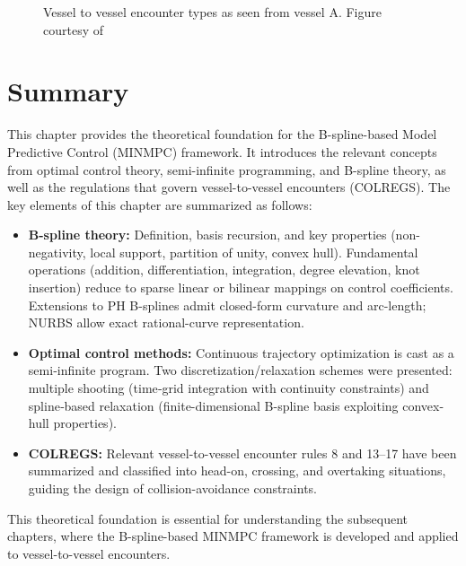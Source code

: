 \begin{figure}[htbp]
    \centering
    
    \caption{Vessel to vessel encounter types as seen from vessel A. Figure courtesy of \cite{Thyri2022-VO}}
    \label{fig:v2v-encounters}
\end{figure}



%     




\section{Summary}
This chapter provides the theoretical foundation for the B-spline-based Model Predictive Control (MINMPC) framework. It introduces the relevant concepts from optimal control theory, semi-infinite programming, and B-spline theory, as well as the regulations that govern vessel-to-vessel encounters (COLREGS).
The key elements of this chapter are summarized as follows:
\begin{itemize}
    \item \textbf{B-spline theory:}  
      Definition, basis recursion, and key properties (non-negativity, local support, partition of unity, convex hull). Fundamental operations (addition, differentiation, integration, degree elevation, knot insertion) reduce to sparse linear or bilinear mappings on control coefficients. Extensions to PH B-splines admit closed-form curvature and arc-length; NURBS allow exact rational-curve representation.
    \item \textbf{Optimal control methods:}  
      Continuous trajectory optimization is cast as a semi‐infinite program. Two discretization/relaxation schemes were presented: multiple shooting (time‐grid integration with continuity constraints) and spline‐based relaxation (finite-dimensional B-spline basis exploiting convex-hull properties).
  \item \textbf{COLREGS:}  
    Relevant vessel-to-vessel encounter rules 8 and 13–17 have been summarized and classified into head-on, crossing, and overtaking situations, guiding the design of collision-avoidance constraints.
\end{itemize}
This theoretical foundation is essential for understanding the subsequent chapters, where the B-spline-based MINMPC framework is developed and applied to vessel-to-vessel encounters.